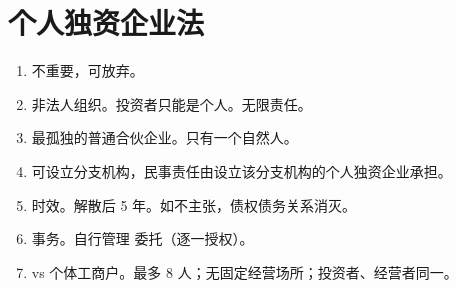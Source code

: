 \section{个人独资企业法}
\begin{enumerate}
  \item 不重要，可放弃。
  \item 非法人组织。投资者只能是个人。无限责任。
  \item 最孤独的普通合伙企业。只有一个自然人。
  \item 可设立分支机构，民事责任由设立该分支机构的个人独资企业承担。
  \item 时效。解散后 5 年。如不主张，债权债务关系消灭。
  \item 事务。自行管理 \hz 委托（逐一授权）。
  \item vs 个体工商户。最多 8 人；无固定经营场所；投资者、经营者同一。
\end{enumerate}
